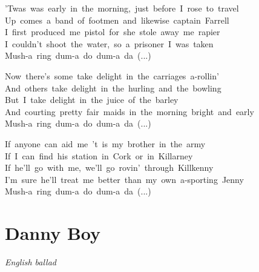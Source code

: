 \documentclass[12pt,a5paper,openany]{memoir}
\newcommand\I[0]{%
  \ignorespaces
}
\newcommand\songtitle[1]{%
  \FloatBlock
  \vfil
  \pagebreak[2]
  \vfilneg
  \section{#1}
}
\newcommand\subtitle[1]{%
  \emph{#1}
}
\begin{document}
\begin{description}[leftmargin=2.5em,style=nextline,itemsep=1ex]
        \item[4.]'Twas~was~early~in~the~morning,~just~before~I~rose~to~travel\\
        Up~comes~a~band~of~footmen~and~likewise~captain~Farrell\\
        I~first~produced~me~pistol~for~she~stole~away~me~rapier\\
        I~couldn't~shoot~the~water,~so~a~prisoner~I~was~taken\\
        Mush-a~ring~dum-a~do~dum-a~da~(...)
        
        \item[5.]Now~there's~some~take~delight~in~the~carriages~a-rollin'\\
        And~others~take~delight~in~the~hurling~and~the~bowling\\
        But~I~take~delight~in~the~juice~of~the~barley\\
        And~courting~pretty~fair~maids~in~the~morning~bright~and~early\\
        Mush-a~ring~dum-a~do~dum-a~da~(...)
        
        \item[6.]If~anyone~can~aid~me~'t~is~my~brother~in~the~army\\
        If~I~can~find~his~station~in~Cork~or~in~Killarney\\
        If~he'll~go~with~me,~we'll~go~rovin'~through~Killkenny\\
        I'm~sure~he'll~treat~me~better~than~my~own~a-sporting~Jenny\\
        Mush-a~ring~dum-a~do~dum-a~da~(...)
        
  \end{description}
  \songtitle{\I Danny Boy}

  
    \begin{center}
    \subtitle{\I English ballad}
    
    \end{center}
  
\end{document}
